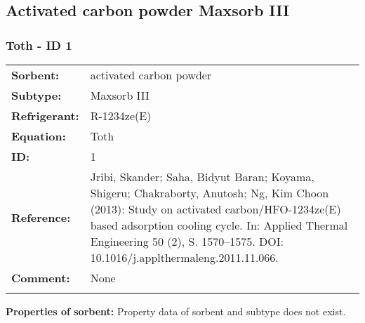 \subsection{Activated carbon powder Maxsorb III}
%
\subsubsection{Toth - ID 1}
%
\begin{tabular}[l]{|lp{11.5cm}|}
\hline
\addlinespace

\textbf{Sorbent:} & activated carbon powder \\
\textbf{Subtype:} & Maxsorb III \\
\textbf{Refrigerant:} & R-1234ze(E)  \\
\textbf{Equation:} & Toth \\
\textbf{ID:} & 1 \\
\textbf{Reference:} & Jribi, Skander; Saha, Bidyut Baran; Koyama, Shigeru; Chakraborty, Anutosh; Ng, Kim Choon (2013): Study on activated carbon/HFO-1234ze(E) based adsorption cooling cycle. In: Applied Thermal Engineering 50 (2), S. 1570–1575. DOI: 10.1016/j.applthermaleng.2011.11.066. \\
\textbf{Comment:} & None \\

\addlinespace
\hline
\end{tabular}
\newline

\textbf{Properties of sorbent:}
\newline
%
Property data of sorbent and subtype does not exist.

